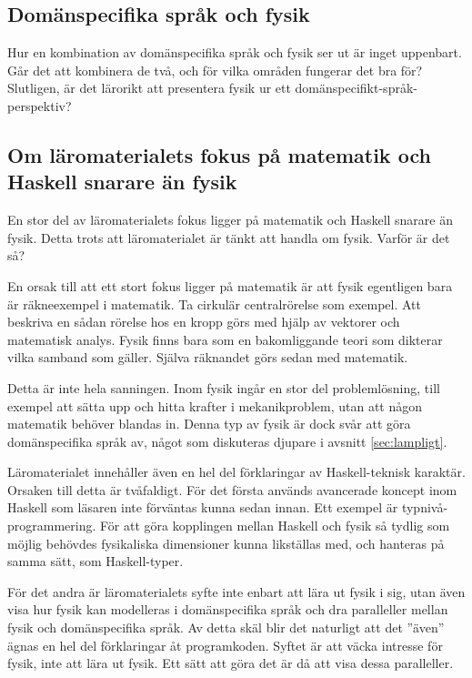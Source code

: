 \begin{binge}
\section{Domänspecifika språk och fysik}

Hur en kombination av domänspecifika språk och fysik ser ut är inget uppenbart. Går det att kombinera de två, och för vilka områden fungerar det bra för? Slutligen, är det lärorikt att presentera fysik ur ett domänspecifikt-språk-perspektiv?

\subsection{Om läromaterialets fokus på matematik och Haskell snarare än fysik}

En stor del av läromaterialets fokus ligger på matematik och Haskell snarare än
fysik. Detta trots att läromaterialet är tänkt att handla om fysik. Varför är
det så?

En orsak till att ett stort fokus ligger på matematik är att fysik egentligen
bara är räkneexempel i matematik. Ta cirkulär centralrörelse som exempel. Att
beskriva en sådan rörelse hos en kropp görs med hjälp av vektorer och
matematisk analys. Fysik finns bara som en bakomliggande teori som dikterar
vilka samband som gäller. Själva räknandet görs sedan med matematik.

Detta är inte hela sanningen. Inom fysik ingår en stor del problemlösning, till
exempel att sätta upp och hitta krafter i mekanikproblem, utan att någon
matematik behöver blandas in. Denna typ av fysik är dock svår att göra
domänspecifika språk av, något som diskuteras djupare i avsnitt
\ref{sec:lampligt}.

Läromaterialet innehåller även en hel del förklaringar av Haskell-teknisk
karaktär. Orsaken till detta är tvåfaldigt. För det första
används avancerade koncept inom Haskell som läsaren inte förväntas kunna sedan
innan. Ett exempel är typnivå-programmering. För att göra kopplingen mellan
Haskell och fysik så tydlig som möjlig behövdes fysikaliska dimensioner kunna
likställas med, och hanteras på samma sätt, som Haskell-typer.

För det andra är läromaterialets syfte inte enbart att lära ut fysik i sig,
utan även visa hur fysik kan modelleras i domänspecifika språk och dra
paralleller mellan fysik och domänspecifika språk. Av detta skäl blir det
naturligt att det ''även'' ägnas en hel del förklaringar åt programkoden.
Syftet är att väcka intresse för fysik, inte att lära ut fysik. Ett sätt att
göra det är då att visa dessa paralleller.


\end{binge}
